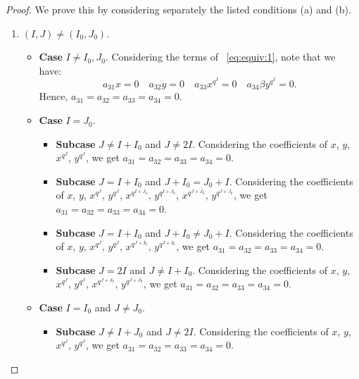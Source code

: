 \begin{proof}
We prove this by considering separately the listed conditions (a) and (b).

\begin{enumerate}
    \item  $(I,J)\neq (I_0, J_0)$.

\begin{itemize}
    \item \textbf{Case} $I \neq I_0, J_0$.
    Considering the terms of ~\eqref{eq:equiv:1}, note that we have:
    \begin{equation*}
    a_{31} x=0 \quad
    a_{32}  y =0\quad
    a_{33} x^{q^I}=0\quad
a_{34}\beta  y ^{q^{I}}=0.
\end{equation*}
Hence, $a_{31} = a_{32} = a_{33} = a_{34} = 0$.

    \item \textbf{Case} $I = J_0$.

\begin{itemize}
    \item \textbf{Subcase} $J\neq I + I_0$ and $J\neq 2I$.
    Considering the coefficients of $x$, $ y $, $x^{q^J}$, $ y ^{q^J}$, we get $a_{31} = a_{32} = a_{33} = a_{34} = 0$.

\item \textbf{Subcase} $J = I + I_0$ and $J + I_0 = J_0 + I$.
Considering the coefficients of $x$, $ y $, $x^{q^J}$, $ y ^{q^J}$, $x^{q^{I+J_0}}$, $ y ^{q^{I+J_0}}$, $x^{q^{J+J_0}}$, $ y ^{q^{J+J_0}}$, we get
$a_{31} = a_{32} = a_{33} = a_{34} = 0$.

\item \textbf{Subcase} $J = I + I_0$ and $J + I_0 \neq J_0 + I$.
Considering the coefficients of $x$, $ y $, $x^{q^J}$, $ y ^{q^J}$,  $x^{q^{J+I_0}}$, $ y ^{q^{J+I_0}}$, we get
 $a_{31} = a_{32} = a_{33} = a_{34} = 0$.

\item \textbf{Subcase} $J = 2I$ and $J\neq I+I_0$.
Considering the coefficients of $x$, $ y $, $x^{q^J}$, $ y ^{q^J}$,  $x^{q^{J+J_0}}$, $ y ^{q^{J+J_0}}$, we get
$a_{31} = a_{32} = a_{33} = a_{34} = 0$.
\end{itemize}

\item \textbf{Case} $I = I_0$ and $J \neq J_0$.
\begin{itemize}
    \item \textbf{Subcase} $J\neq I + J_0$ and $J\neq 2I$.
Considering the coefficients of $x$, $ y $, $x^{q^J}$, $ y ^{q^J}$, we get
$a_{31} = a_{32} = a_{33} = a_{34} = 0$.


\end{itemize}
\end{itemize}
\end{enumerate}
\end{proof}
